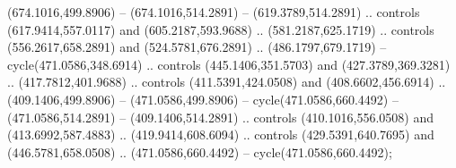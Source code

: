 {{\begin{scope}[y=-0.80pt,x=0.80pt,scale=0.038,xshift=-383pt,yshift=405pt]
        (674.1016,499.8906) -- (674.1016,514.2891) -- (619.3789,514.2891) .. controls
        (617.9414,557.0117) and (605.2187,593.9688) .. (581.2187,625.1719) .. controls
        (556.2617,658.2891) and (524.5781,676.2891) .. (486.1797,679.1719) --
        cycle(471.0586,348.6914) .. controls (445.1406,351.5703) and
        (427.3789,369.3281) .. (417.7812,401.9688) .. controls (411.5391,424.0508) and
        (408.6602,456.6914) .. (409.1406,499.8906) -- (471.0586,499.8906) --
        cycle(471.0586,660.4492) -- (471.0586,514.2891) -- (409.1406,514.2891) ..
        controls (410.1016,556.0508) and (413.6992,587.4883) .. (419.9414,608.6094) ..
        controls (429.5391,640.7695) and (446.5781,658.0508) .. (471.0586,660.4492) --
        cycle(471.0586,660.4492);
    \end{scope}
  }
}